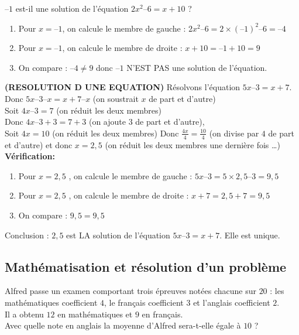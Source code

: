 \documentclass[10pt]{article}
\begin{document}
{\begin{Ex}
$–1$ est-il une solution de l'équation $2x^2 – 6 = x + 10$ ?
\begin{enumerate}
\item Pour $x = –1$, on calcule le membre de gauche : 	$2x^2 – 6 = 2 \times \left(–1\right)^2 – 6 = –4$
\item Pour $x = –1$, on calcule le membre de droite : 	$x + 10 = –1 + 10 = 9$
\item On compare :  $–4 \neq 9$	 donc $–1$ N'EST PAS une solution de l'équation.
\end{enumerate}
\end{Ex}		
		
\begin{Ex} \textbf{(RESOLUTION D UNE EQUATION)}
Résolvons l'équation $5x – 3 = x + 7$.\\
Donc $5x – 3 – x=x + 7 – x$ (on soustrait $x$ de part et d'autre)\\
Soit $4x – 3=7$ (on réduit les deux membres)\\
Donc $4x – 3 + 3=7 + 3$ (on ajoute $3$ de part et d'autre),\\
Soit $4x=10$ (on réduit les deux membres)
Donc $\frac{4x}{4}=\frac{10}{4}$ (on divise par $4$ de part et d'autre) et donc 
$x=2,5$ (on réduit les deux membres une dernière fois \ldots{})\\

\textbf{Vérification:}
\begin{enumerate}
\item 	Pour $x = 2,5$ , on calcule le membre de gauche : $5x – 3 = 5 \times 2,5 – 3 = 9,5$
\item Pour $x = 2,5$ , on calcule le membre de droite :    $x + 7 = 2,5 + 7 = 9,5$
\item On compare :  $9,5 = 9,5$
\end{enumerate}
Conclusion :	$2,5$ est LA solution de l'équation $5x – 3 = x + 7$. Elle est unique.
\end{Ex}

\subsection{Mathématisation et résolution d'un problème}
\begin{shaded}
Alfred passe un examen comportant trois épreuves notées chacune sur $20$ : les mathématiques coefficient $4$, le français coefficient $3$ et l'anglais coefficient $2$.\\
Il a obtenu $12$ en mathématiques et $9$ en français.\\
Avec quelle note en anglais la moyenne d'Alfred sera-t-elle égale à $10$ ?
\end{shaded}

}
\end{document}
